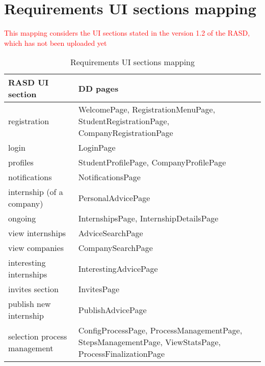	\section{Requirements UI sections mapping}
		\textcolor{red}{This mapping considers the UI sections stated in the version 1.2 of the RASD, which has not been uploaded yet}
		\begin{table}[H]
			\begin{tabular}{ | m{6cm} | m{6cm} | } 
				\hline
					\textbf {RASD UI section} & \textbf{DD pages} \\
				\hline
					registration & WelcomePage, RegistrationMenuPage, StudentRegistrationPage, CompanyRegistrationPage\\
				\hline
					login & LoginPage\\
				\hline
					profiles & StudentProfilePage, CompanyProfilePage \\
				\hline
					notifications & NotificationsPage\\
				\hline
					internship (of a company) & PersonalAdvicePage\\
				\hline
					ongoing & InternshipsPage, InternshipDetailsPage\\
				\hline
					view internships & AdviceSearchPage\\
				\hline
					view companies & CompanySearchPage\\
				\hline
					interesting internships & InterestingAdvicePage\\
				\hline
					invites section & InvitesPage\\
				\hline
					publish new internship & PublishAdvicePage\\
				\hline
					selection process management & ConfigProcessPage, ProcessManagementPage, StepsManagementPage, ViewStatsPage, ProcessFinalizationPage \\
				\hline
			\end{tabular}
			\caption{Requirements UI sections mapping}
		\end{table}